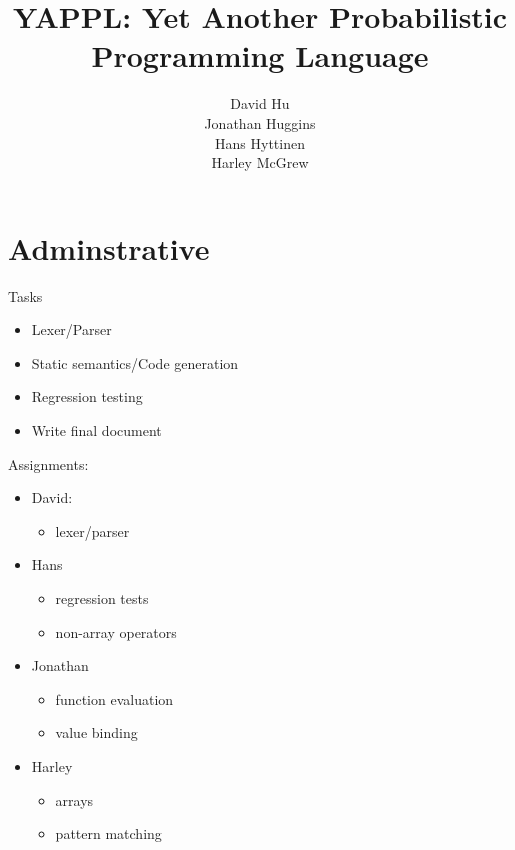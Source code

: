 \documentclass[11pt]{article}
\begin{document}
\setcounter{secnumdepth}{5}


\title{YAPPL: Yet Another Probabilistic Programming Language}
\author{  David Hu \\ Jonathan Huggins \\ Hans Hyttinen  \\ Harley McGrew}

\maketitle

\fancyhead{}
\fancyhead[L]{}
\fancyhead[R]{}

\newpage

\tableofcontents

\newpage

\section{ Adminstrative}

Tasks
\begin{itemize}
\item Lexer/Parser
\item Static semantics/Code generation
\item Regression testing
\item Write final document
\end{itemize}

Assignments:
\begin{itemize}
\item David:
\begin{itemize}
\item lexer/parser
\end{itemize}
\item Hans
\begin{itemize}
\item regression tests
\item non-array operators
\end{itemize}
\item Jonathan
\begin{itemize}
\item function evaluation
\item value binding
\end{itemize}
\item Harley
\begin{itemize}
\item arrays
\item pattern matching
\end{itemize}
\end{itemize}
\end{document}
